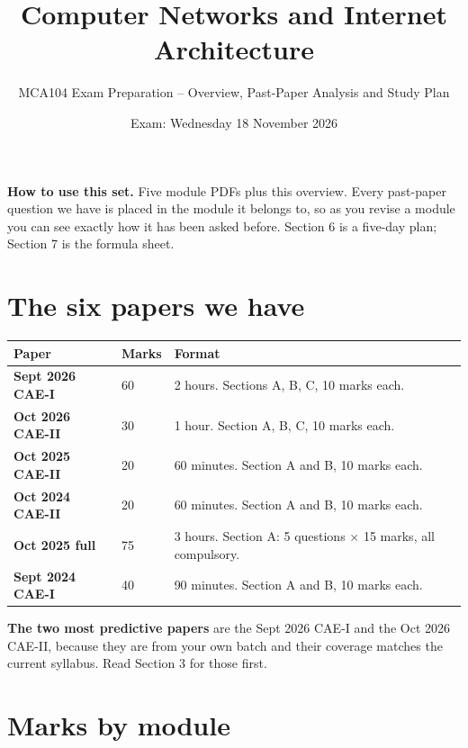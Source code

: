 \documentclass[11pt,a4paper]{article}
\title{\textbf{Computer Networks and Internet Architecture}\\}
\author{\large MCA104 Exam Preparation -- Overview, Past-Paper Analysis and Study Plan}
\date{Exam: Wednesday 18 November 2026}
\begin{document}
\maketitle

\begin{exambox}
\textbf{How to use this set.} Five module PDFs plus this overview. Every past-paper question we have is placed in the module it belongs to, so as you revise a module you can see exactly how it has been asked before. Section 6 is a five-day plan; Section 7 is the formula sheet.
\end{exambox}

\tableofcontents
\newpage

\section{The six papers we have}

\begin{center}\small
\begin{tabularx}{\textwidth}{>{\bfseries}p{} p{} X}
\toprule Paper & Marks & Format\\
\midrule
Sept 2026 CAE-I & 60 & 2 hours. Sections A, B, C, 10 marks each.\\
Oct 2026 CAE-II & 30 & 1 hour. Section A, B, C, 10 marks each.\\
Oct 2025 CAE-II & 20 & 60 minutes. Section A and B, 10 marks each.\\
Oct 2024 CAE-II & 20 & 60 minutes. Section A and B, 10 marks each.\\
Oct 2025 full & 75 & 3 hours. Section A: 5 questions $\times$ 15 marks, all compulsory.\\
Sept 2024 CAE-I & 40 & 90 minutes. Section A and B, 10 marks each.\\
\bottomrule
\end{tabularx}
\end{center}

\begin{exambox}
\textbf{The two most predictive papers} are the Sept 2026 CAE-I and the Oct 2026 CAE-II, because they are from your own batch and their coverage matches the current syllabus. Read Section 3 for those first.
\end{exambox}

\section{Marks by module}
\end{document}
